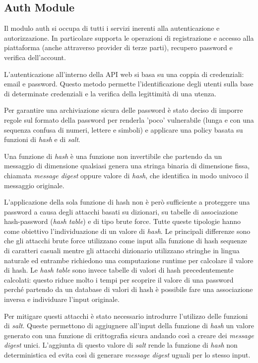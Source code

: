 \subsection{Auth Module}
Il modulo auth si occupa di tutti i servizi inerenti alla autenticazione e autorizzazione.
In particolare supporta le operazioni di registrazione e accesso alla piattaforma (anche attraverso provider di terze parti), recupero password e verifica dell'account.

L'autenticazione all'interno della API web si basa su una coppia di credenziali: email e password.
Questo metodo permette l'identificazione degli utenti sulla base di determinate credenziali e la
verifica della legittimità di una utenza.

Per garantire una archiviazione sicura delle password è stato deciso di imporre regole sul formato della password per renderla 'poco' vulnerabile (lunga e con una sequenza confusa di numeri, lettere e simboli)
e applicare una policy basata su funzioni di \textit{hash} e di \textit{salt}.

Una funzione di \textit{hash} è una funzione non invertibile che partendo da un messaggio di dimensione qualsiasi genera una stringa
binaria di dimensione fissa, chiamata \textit{message digest} oppure valore di \textit{hash}, che identifica in modo univoco il messaggio originale.

L'applicazione della sola funzione di hash non è però sufficiente a proteggere una password a causa degli attacchi basati su dizionari, su tabelle di associazione
hash-password (\textit{hash table}) e di tipo brute force. Tutte queste tipologie hanno come obiettivo l'individuazione di un valore di \textit{hash}.
Le principali differenze sono che gli attacchi brute force utilizzano come input alla funzione di hash sequenze di caratteri casuali mentre gli attacchi dizionario utilizzano
stringhe in lingua naturale ed entrambe richiedono una computazione runtime per calcolare il valore di hash.
Le \textit{hash table} sono invece tabelle di valori di hash precedentemente calcolati: questo riduce molto i tempi per scoprire il valore di una password
perché partendo da un database di valori di hash è possibile fare una associazione inversa e individuare l'input originale.

Per mitigare questi attacchi è stato necessario introdurre l'utilizzo delle funzioni di \textit{salt}.
Queste permettono di aggiugnere all'input della funzione di \textit{hash} un valore generato con una funzione di crittografia sicura andando così a creare dei \textit{message digest} unici.
L'aggiunta di questo valore di \textit{salt} rende la funzione di \textit{hash} non deterministica ed
evita così di generare \textit{message digest} uguali per lo stesso input.

